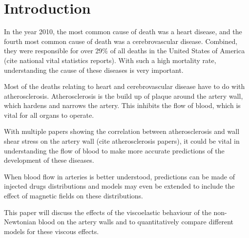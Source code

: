 \section{Introduction}
In the year 2010, the most common cause of death was a heart disease, and the fourth most common cause of death was a cerebrovascular disease. Combined, they were responsible for over 29\% of all deaths in the United States of America (cite national vital statistics reports). With such a high mortality rate, understanding the cause of these diseases is very important. 

Most of the deaths relating to heart and cerebrovascular disease have to do with atherosclerosis. Atherosclerosis is the build up of plaque around the artery wall, which hardens and narrows the artery. This inhibits the flow of blood, which is vital for all organs to operate.

With multiple papers showing the correlation between atherosclerosis and wall shear stress on the artery wall (cite atherosclerosis papers), it could be vital in understanding the flow of blood to make more accurate predictions of the development of these diseases. 

When blood flow in arteries is better understood, predictions can be made of injected drugs distributions and models may even be extended to include the effect of magnetic fields on these distributions. 






This paper will discuss the effects of the viscoelastic behaviour of the non-Newtonian blood on the artery walls and to quantitatively compare different models for these viscous effects. 